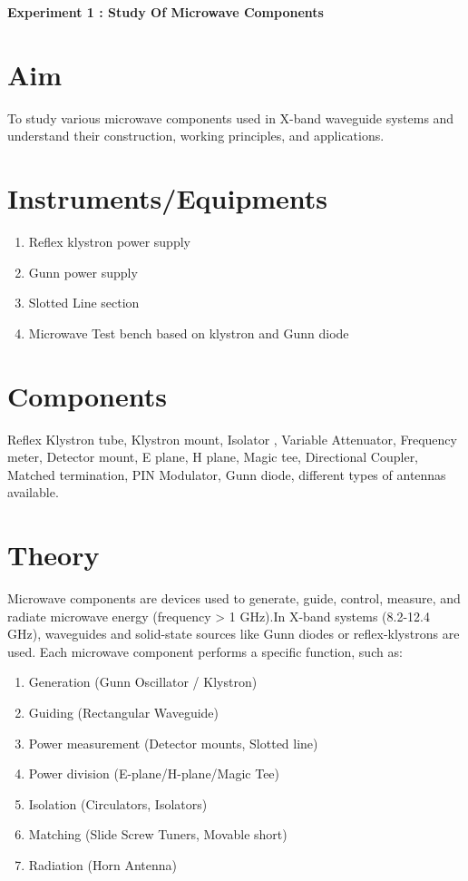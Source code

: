 \documentclass[11pt, a4paper]{article}
\begin{document}
\begin{center}
	\fontsize{16}{16}
	\selectfont
	\textbf{Experiment 1 : Study Of Microwave Components}
\end{center}
\selectfont
\section*{Aim}
To study various microwave components used in X-band waveguide systems and understand their construction,
working principles, and applications.
\section*{Instruments/Equipments}
\begin{enumerate}
	\item Reflex klystron power supply
	\item Gunn power supply
	\item Slotted Line section
	\item Microwave Test bench based on klystron and Gunn diode
\end{enumerate}
\section*{Components}
Reflex Klystron tube, Klystron mount, Isolator , Variable Attenuator, Frequency meter, Detector mount, E plane,
H plane, Magic tee, Directional Coupler, Matched termination, PIN Modulator, Gunn diode, different types of
antennas available.
\section*{Theory}
Microwave components are devices used to generate, guide, control, measure, and radiate microwave energy
(frequency > 1 GHz).In X-band systems (8.2-12.4 GHz), waveguides and solid-state sources like Gunn diodes
or reflex-klystrons are used.
Each microwave component performs a specific function, such as:
\begin{enumerate}
\item Generation (Gunn Oscillator / Klystron)
\item Guiding (Rectangular Waveguide)
\item Power measurement (Detector mounts, Slotted line)
\item Power division (E-plane/H-plane/Magic Tee)
\item Isolation (Circulators, Isolators)
\item Matching (Slide Screw Tuners, Movable short)
\item Radiation (Horn Antenna)
\end{enumerate}
\end{document}
